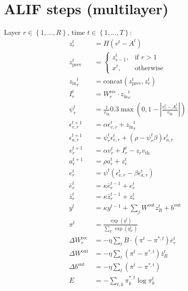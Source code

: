\documentclass{article}
\begin{document}
\section{ALIF steps (multilayer)}
Layer $r \in \left\{1, \ldots, R\right\}$, time $t \in \left\{1, \ldots, T\right\}$:
\begin{align}
z^t_{r} &= H\left(v^t-A^t\right)\\
z_\text{prev}^t &= \begin{cases}z^t_{r-1},&\text{if }r > 1\\x^t,&\text{otherwise}\end{cases}\\
{z_\text{in}}^t_{r} &= \text{concat}(z_\text{prev}^t, z^t_{r})\\
I^t_{r} &= W^\text{rec}_r \cdot {z_\text{in}}^t_{r} \\
\psi^t_r &= \frac{1}{v_\text{th}}0.3\max\left(0, 1-\left|\frac{v^t_r-A^t_r}{v_\text{th}}\right|\right)\\
\epsilon_{v, r}^{t+1} &= \alpha\epsilon_{v, r}^t + {z_\text{in}}_r^t\\
\epsilon_{a, r}^{t+1} &= \psi^t_r\epsilon_{v, r}^t + \left(\rho - \psi^t_r\beta\right)\epsilon_{a, r}^t\\
v^{t+1}_r &= \alpha v_r^t + I_r^t-z_rv_\text{th}\\
a^{t+1}_r &= \rho a_r^t + z_r^t\\
e^t_r &= \psi^t\left(\epsilon^t_{v, r} - \beta\epsilon^t_{a, r}\right)\\
\bar{e}^t_r &= \kappa\bar{e}^{t-1}_r + e^t_r\\
\bar{z}^t_r &= \kappa\bar{z}^{t-1}_r + z^t_r\\
y^t &= \kappa y^{t-1} + \sum_j W^\text{out}z^t_{R}+b^\text{out}\\
\pi^t &= \frac{\exp\left(y^t\right)}{\sum_{k'}\exp\left( y^t_{k'}\right)}\\
\Delta W^\text{rec}_r &= -\eta\sum_tB \cdot\left(\pi^t-\pi^{*,t}\right)\bar{e}^t_r\\
\Delta W^\text{out} &= -\eta\sum_t\left(\pi^t-\pi^{*,t}\right)\bar{z}^t_R\\
\Delta b^\text{out} &= -\eta\sum_t\left(\pi^t-\pi^{*,t}\right)\\
E &= -\sum_{t, k}\pi_k^{*,t}\log\pi_k^t
\end{align}
\end{document}

